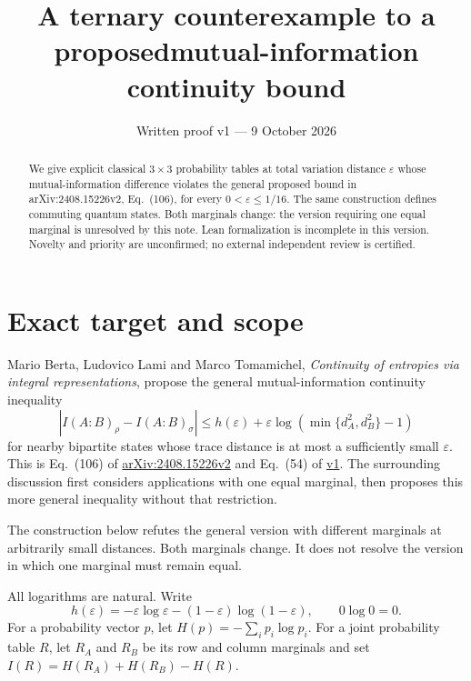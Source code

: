 \documentclass[11pt,a4paper]{article}
\title{A ternary counterexample to a proposed\newline mutual-information continuity bound}
\author{}
\date{Written proof v1 --- 9 October 2026}
\newcommand{\eps}{\varepsilon}
\begin{document}
\maketitle
\begin{abstract}
We give explicit classical $3\times3$ probability tables at total variation distance $\eps$ whose mutual-information difference violates the general proposed bound in arXiv:2408.15226v2, Eq.~(106), for every $0<\eps\le1/16$. The same construction defines commuting quantum states. Both marginals change: the version requiring one equal marginal is unresolved by this note. Lean formalization is incomplete in this version. Novelty and priority are unconfirmed; no external independent review is certified.
\end{abstract}

\section{Exact target and scope}
Mario Berta, Ludovico Lami and Marco Tomamichel, \emph{Continuity of entropies via integral representations}, propose the general mutual-information continuity inequality
\begin{equation}\label{eq:target}
\left|I(A:B)_\rho-I(A:B)_\sigma\right|
\le h(\eps)+\eps\log\!\left(\min\{d_A^2,d_B^2\}-1\right)
\end{equation}
for nearby bipartite states whose trace distance is at most a sufficiently small $\eps$. This is Eq.~(106) of \href{https://arxiv.org/html/2408.15226v2\#S4}{arXiv:2408.15226v2} and Eq.~(54) of \href{https://arxiv.org/html/2408.15226v1\#S3.SS3}{v1}. The surrounding discussion first considers applications with one equal marginal, then proposes this more general inequality without that restriction.

The construction below refutes the general version with different marginals at arbitrarily small distances. Both marginals change. It does not resolve the version in which one marginal must remain equal.

All logarithms are natural. Write
\begin{equation}
h(\eps)=-\eps\log\eps-(1-\eps)\log(1-\eps),\qquad 0\log0=0.
\end{equation}
For a probability vector $p$, let $H(p)=-\sum_i p_i\log p_i$. For a joint probability table $R$, let $R_A$ and $R_B$ be its row and column marginals and set $I(R)=H(R_A)+H(R_B)-H(R)$.
\end{document}
